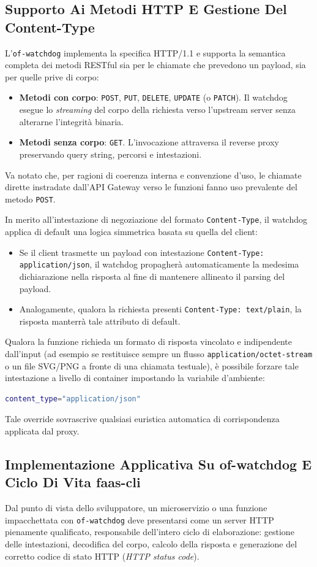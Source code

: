 \documentclass[11pt, a4paper]{article}
\begin{document}
\subsection{Supporto Ai Metodi HTTP E Gestione Del Content-Type}
L'\texttt{of-watchdog} implementa la specifica HTTP/1.1 e supporta la semantica completa dei metodi RESTful sia per le chiamate che prevedono un payload, sia per quelle prive di corpo:
\begin{itemize}[noitemsep]
    \item \textbf{Metodi con corpo}: \texttt{POST}, \texttt{PUT}, \texttt{DELETE}, \texttt{UPDATE} (o \texttt{PATCH}). Il watchdog esegue lo \emph{streaming} del corpo della richiesta verso l'upstream server senza alterarne l'integrità binaria.
    \item \textbf{Metodi senza corpo}: \texttt{GET}. L'invocazione attraversa il reverse proxy preservando query string, percorsi e intestazioni.
\end{itemize}
Va notato che, per ragioni di coerenza interna e convenzione d'uso, le chiamate dirette instradate dall'API Gateway verso le funzioni fanno uso prevalente del metodo \texttt{POST}.

In merito all'intestazione di negoziazione del formato \texttt{Content-Type}, il watchdog applica di default una logica simmetrica basata su quella del client:
\begin{itemize}[noitemsep]
    \item Se il client trasmette un payload con intestazione \texttt{Content-Type: application/json}, il watchdog propagherà automaticamente la medesima dichiarazione nella risposta al fine di mantenere allineato il parsing del payload.
    \item Analogamente, qualora la richiesta presenti \texttt{Content-Type: text/plain}, la risposta manterrà tale attributo di default.
\end{itemize}
Qualora la funzione richieda un formato di risposta vincolato e indipendente dall'input (ad esempio se restituisce sempre un flusso \texttt{application/octet-stream} o un file SVG/PNG a fronte di una chiamata testuale), è possibile forzare tale intestazione a livello di container impostando la variabile d'ambiente:
\begin{lstlisting}[language=bash]
content_type="application/json"
\end{lstlisting}
Tale override sovrascrive qualsiasi euristica automatica di corrispondenza applicata dal proxy.

\subsection{Implementazione Applicativa Su of-watchdog E Ciclo Di Vita faas-cli}
Dal punto di vista dello sviluppatore, un microservizio o una funzione impacchettata con \texttt{of-watchdog} deve presentarsi come un server HTTP pienamente qualificato, responsabile dell'intero ciclo di elaborazione: gestione delle intestazioni, decodifica del corpo, calcolo della risposta e generazione del corretto codice di stato HTTP (\emph{HTTP status code}).
\end{document}
